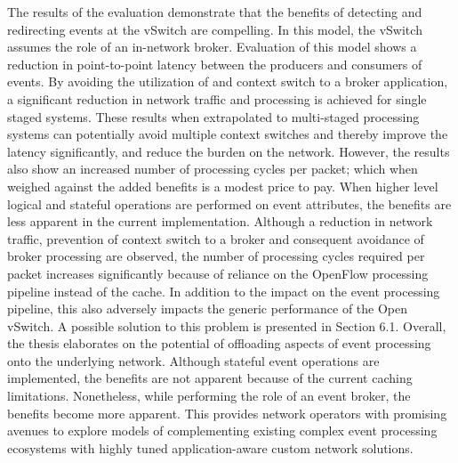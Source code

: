 The results of the evaluation demonstrate that the benefits of detecting and redirecting events at the vSwitch are compelling. In this model, the vSwitch assumes the role of an in-network broker. Evaluation of this model shows a reduction in point-to-point latency between the producers and consumers of events. By avoiding the utilization of and context switch to a broker application, a significant reduction in network traffic and processing is achieved for single staged systems. These results when extrapolated to multi-staged processing systems can potentially avoid multiple context switches and thereby improve the latency significantly, and reduce the burden on the network. However, the results also show an increased number of processing cycles per packet; which when weighed against the added benefits is a modest price to pay. When higher level logical and stateful operations are performed on event attributes, the benefits are less apparent in the current implementation. Although a reduction in network traffic, prevention of context switch to a broker and consequent avoidance of broker processing are observed, the number of processing cycles required per packet increases significantly because of reliance on the OpenFlow processing pipeline instead of the cache. In addition to the impact on the event processing pipeline, this also adversely impacts the generic performance of the Open vSwitch. A possible solution to this problem is presented in Section 6.1. Overall, the thesis elaborates on the potential of offloading aspects of event processing onto the underlying network. Although stateful event operations are implemented, the benefits are not apparent because of the current caching limitations. Nonetheless, while performing the role of an event broker, the benefits become more apparent. This provides network operators with promising avenues to explore models of complementing existing complex event processing ecosystems with highly tuned application-aware custom network solutions.

